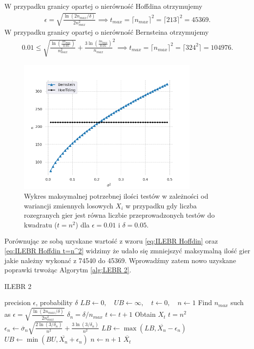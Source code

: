 \documentclass[inzynierska]{pwr_wmat_praca_dyplomowa}
\theoremstyle{plain}
\numberwithin{theorem}{chapter}
\theoremstyle{definition}
\numberwithin{theorem}{chapter}
\begin{document}
	W przypadku granicy opartej o nierówność Hoffdina otrzymujemy
	\begin{gather}
		\label{eq:ILEBR Hoffdin t=n^2}
		\epsilon =  \sqrt{\frac{\ln(2n_{max}/\delta)}{2n_{max}^2}} \implies t_{max} = \lceil n_{max} \rceil^2 = \lceil213\rceil^2= 45369.
	\end{gather}
	W przypadku granicy opartej o nierówność Bernsteina otrzymujemy
	\begin{gather}
		\label{eq:ILEBR Bernstein t=n^2}
		0.01 \le \sqrt{\frac{\ln(\frac{3n_{max}}{0.05})}{n_{max}^2}} + \frac{3  \ln(\frac{3n_{max}}{0.05})}{n_{max}}^2\implies t_{max} = \lceil n_{max} \rceil^2 = \lceil324^2\rceil= 104976. 
	\end{gather}
	\begin{figure}[H]
		\centering
		\includegraphics[width=0.8\textwidth]{imagens/t_eq_n_q.png}
		\captionsetup{justification=centering}
		\caption{Wykres maksymalnej potrzebnej ilości testów w zależności od wariancji zmiennych losowych  $X_i$ w przypadku gdy liczba rozegranych gier jest równa liczbie przeprowadzonych testów do kwadratu ($t = n^2$) dla $\epsilon=0.01$ i $\delta = 0.05$.}
		\label{fig:t_eq_n_q}
	\end{figure}
	Porównując ze sobą uzyskane wartość z wzoru \ref{eq:ILEBR Hoffdin} oraz \ref{eq:ILEBR Hoffdin t=n^2} widzimy że udało się zmniejszyć maksymalną ilość gier jakie należny wykonać z 74540 do 45369.
	Wprowadźmy zatem nowo uzyskane poprawki trwożąc Algorytm \ref{alg:LEBR 2}.
	\begin{algorithm}[H]
		\caption{ILEBR 2}\label{alg:LEBR 2}
		\begin{algorithmic}
			\Ensure precision $\epsilon$, probability $\delta$
			\State $LB \gets 0, \quad UB \gets \infty, \quad t \gets 0,\quad n \gets 1$
			\State Find $n_{max}$ such as $		\epsilon =  \sqrt{\frac{\ln(2n_{max}/\delta)}{2n_{max}^2}} $
			\Statex $\delta_n = \delta/n_{max}$
			\Repeat 
			\State $t \gets t + 1$
			\State Obtain $X_t$
			\Until $t=n^2$
			\State $\epsilon_n \gets \overline{\sigma}_n \sqrt{\frac{2\ln(3/\delta_n)}{n^2}} + \frac{3  \ln{(3 / \delta_n)}}{n^2}$ 
			\State $LB \gets \max(LB,  \overline{X_n} - \epsilon_n)$
			\State $UB \gets \min(BU,  \overline{X_n} + \epsilon_n)$
			\State $n \gets n + 1$
			\EndWhile
			\State \Return $ \overline{X_t}$		
		\end{algorithmic}
	\end{algorithm}
\end{document}
